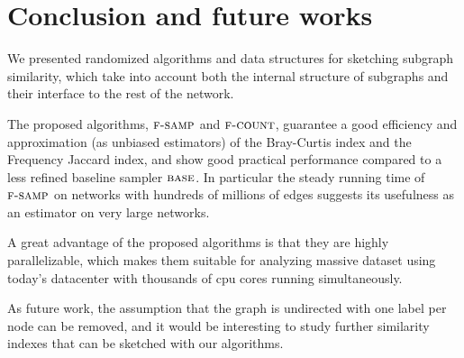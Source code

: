 \chapter{Conclusion and future works}
    

We presented randomized algorithms and data structures for sketching subgraph similarity, which take into account both the internal structure of subgraphs and their interface to the rest of the network. \medskip

The proposed algorithms, $\textsc{f-samp}$ and $\textsc{f-count}$, guarantee a good efficiency and approximation (as unbiased estimators) of the Bray-Curtis index and the Frequency Jaccard index, and show good practical performance compared to a less refined baseline sampler $\textsc{base}$. In particular the steady running time of $\textsc{f-samp}$ on networks with hundreds of millions of edges suggests its usefulness as an estimator on very large networks.\medskip

A great advantage of the proposed algorithms is that they are highly parallelizable, which makes them suitable for analyzing massive dataset using today's datacenter with thousands of cpu cores running simultaneously.\medskip

As future work, the assumption that the graph is undirected with one label per node can be removed, and it would be interesting to study further similarity indexes that can be sketched with our algorithms.